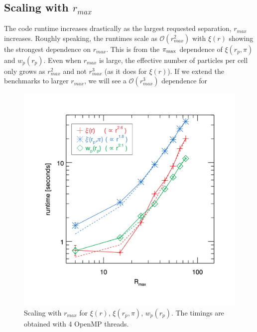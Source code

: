 \documentclass[12pt,titlepage]{article}
\newcommand{\rmax}{\ensuremath{{r_{max}}}\xspace}
\newcommand{\xir}{\ensuremath{{\xi(r)}}\xspace}
\newcommand{\wprp}{\ensuremath{{w_p(r_p)}}\xspace}
\newcommand{\xirppi}{\ensuremath{{\xi(r_p,\pi)}}\xspace}
\newcommand{\pimax}{\ensuremath{{\pi_{\rm max}}}\xspace}
\begin{document}
\subsection{Scaling with \texorpdfstring{\rmax}{rmax}}
The code runtime increases drastically as the largest requested separation, \rmax increases. Roughly speaking, the runtimes scale 
as $\mathcal{O}(r_{max}^2)$ with \xir showing the strongest dependence on \rmax. This is from the \pimax dependence of \xirppi and 
\wprp. Even when \rmax is large, the effective number of particles per cell only grows as $r_{max}^2$ and not $r_{max}^3$ (as it does 
for \xir). If we extend the benchmarks to larger \rmax, we will see a $\mathcal{O}(r_{max}^3)$ dependence for 
\begin{figure}[htbp]
\includegraphics[clip=true,width=\linewidth]{timings_Mr19_rmax}%
\caption{Scaling with \rmax for \xir, \xirppi, \wprp. The timings are obtained 
with 4 OpenMP threads. }
\label{fig:scaling_rmax}
\end{figure}
\end{document}
